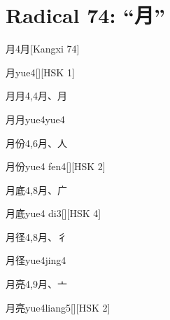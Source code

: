 
\section*{Radical 74: ``⽉''}

\begin{Entry}{月}{4}{⽉}[Kangxi 74]
  \begin{Phonetics}{月}{yue4}[][HSK 1]
  \end{Phonetics}
\end{Entry}

\begin{Entry}{月月}{4,4}{⽉、⽉}
  \begin{Phonetics}{月月}{yue4yue4}
  \end{Phonetics}
\end{Entry}

\begin{Entry}{月份}{4,6}{⽉、⼈}
  \begin{Phonetics}{月份}{yue4 fen4}[][HSK 2]
  \end{Phonetics}
\end{Entry}

\begin{Entry}{月底}{4,8}{⽉、⼴}
  \begin{Phonetics}{月底}{yue4 di3}[][HSK 4]
  \end{Phonetics}
\end{Entry}

\begin{Entry}{月径}{4,8}{⽉、⼻}
  \begin{Phonetics}{月径}{yue4jing4}
  \end{Phonetics}
\end{Entry}

\begin{Entry}{月亮}{4,9}{⽉、⼇}
  \begin{Phonetics}{月亮}{yue4liang5}[][HSK 2]
  \end{Phonetics}
\end{Entry}

